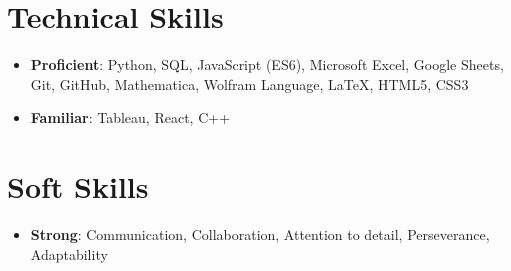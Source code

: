 \documentclass[letterpaper,10.8pt]{article}
\newcommand{\resumeItem}[2]{
  \item\small{
    \textbf{#1}{: #2 \vspace{-2pt}}
  }
}
\newcommand{\resumeSubItem}[2]{\resumeItem{#1}{#2}\vspace{-4pt}}
\newcommand{\resumeSubHeadingListStart}{\begin{itemize}[leftmargin=*]}
\newcommand{\resumeSubHeadingListEnd}{\end{itemize}}
\begin{document}
\section{Technical Skills}
\resumeSubHeadingListStart
\resumeSubItem{Proficient}{Python, SQL, JavaScript (ES6), Microsoft Excel, Google Sheets, Git, GitHub, Mathematica, Wolfram Language, LaTeX, HTML5, CSS3}
\resumeSubItem{Familiar}{Tableau, React, C++}
\resumeSubHeadingListEnd

\section{Soft Skills}
\resumeSubHeadingListStart
\resumeSubItem{Strong}{Communication, Collaboration, Attention to detail, Perseverance, Adaptability}
\resumeSubHeadingListEnd
\end{document}
